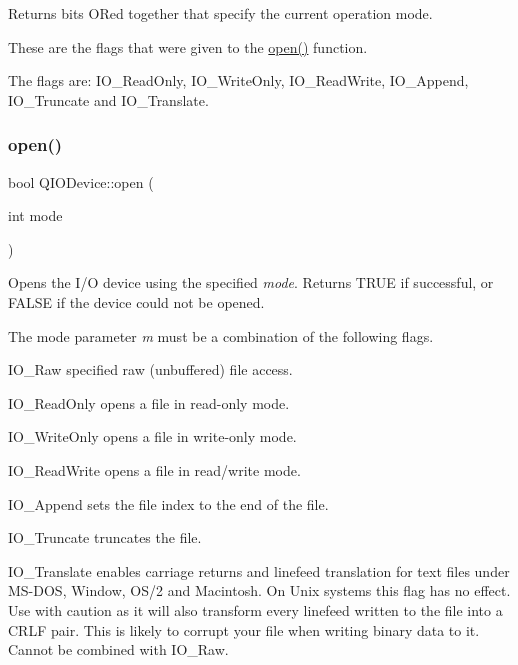 Returns bits OR\textquotesingle{}ed together that specify the current operation mode.

These are the flags that were given to the \mbox{\hyperlink{class_q_i_o_device_ae4046ae7bf4d4cee1010239973314e42}{open()}} function.

The flags are\+: {\ttfamily I\+O\+\_\+\+Read\+Only}, {\ttfamily I\+O\+\_\+\+Write\+Only}, {\ttfamily I\+O\+\_\+\+Read\+Write}, {\ttfamily I\+O\+\_\+\+Append}, {\ttfamily I\+O\+\_\+\+Truncate} and {\ttfamily I\+O\+\_\+\+Translate}. \mbox{\label{class_q_i_o_device_ae4046ae7bf4d4cee1010239973314e42}} 
\subsubsection{\texorpdfstring{open()}{open()}}
{\footnotesize\ttfamily bool Q\+I\+O\+Device\+::open (\begin{DoxyParamCaption}\item[{int}]{mode }\end{DoxyParamCaption})\hspace{0.3cm}{\ttfamily [pure virtual]}}

Opens the I/O device using the specified {\itshape mode}. Returns T\+R\+UE if successful, or F\+A\+L\+SE if the device could not be opened.

The mode parameter {\itshape m} must be a combination of the following flags. 
\begin{DoxyItemize}
\item {\ttfamily I\+O\+\_\+\+Raw} specified raw (unbuffered) file access. 
\item {\ttfamily I\+O\+\_\+\+Read\+Only} opens a file in read-\/only mode. 
\item {\ttfamily I\+O\+\_\+\+Write\+Only} opens a file in write-\/only mode. 
\item {\ttfamily I\+O\+\_\+\+Read\+Write} opens a file in read/write mode. 
\item {\ttfamily I\+O\+\_\+\+Append} sets the file index to the end of the file. 
\item {\ttfamily I\+O\+\_\+\+Truncate} truncates the file. 
\item {\ttfamily I\+O\+\_\+\+Translate} enables carriage returns and linefeed translation for text files under M\+S-\/\+D\+OS, Window, O\+S/2 and Macintosh. On Unix systems this flag has no effect. Use with caution as it will also transform every linefeed written to the file into a C\+R\+LF pair. This is likely to corrupt your file when writing binary data to it. Cannot be combined with {\ttfamily I\+O\+\_\+\+Raw}. 
\end{DoxyItemize}

